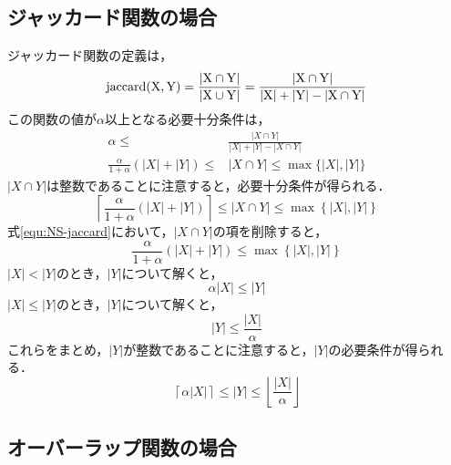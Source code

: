 \documentclass[japanese]{jnlp_JS2.0}
\begin{document}
\subsection*{ジャッカード関数の場合}

ジャッカード関数の定義は，
\begin{equation}
 \rm{jaccard}(X, Y) = \frac{|X \cap Y|}{|X \cup Y|} = \frac{|X \cap Y|}{|X| + |Y| - |X \cap Y|}
\end{equation}
この関数の値が$\alpha$以上となる必要十分条件は，
\begin{align}
 \alpha \leq& \frac{|X \cap Y|}{|X| + |Y| - |X \cap Y|} \\
 \frac{\alpha}{1 + \alpha} \left(|X| + |Y| \right) \leq& |X \cap Y| \leq \max\{|X|, |Y|\} \label{equ:NS-jaccard}
\end{align}
$|X \cap Y|$は整数であることに注意すると，必要十分条件が得られる．
\begin{equation}
 \left\lceil \frac{\alpha}{1 + \alpha} \left(|X| + |Y| \right) \right\rceil \leq |X \cap Y| \leq \max \left\{|X|, |Y|\right\}
\end{equation}
式\ref{equ:NS-jaccard}において，$|X \cap Y|$の項を削除すると，
\begin{equation}
 \frac{\alpha}{1 + \alpha} \left(|X| + |Y| \right) \leq \max \left\{|X|, |Y|\right\}
\end{equation}
$|X| < |Y|$のとき，$|Y|$について解くと，
\begin{equation}
 \alpha |X| \leq |Y|
\end{equation}
$|X| \leq |Y|$のとき，$|Y|$について解くと，
\begin{equation}
 |Y| \leq \frac{|X|}{\alpha}
\end{equation}
これらをまとめ，$|Y|$が整数であることに注意すると，$|Y|$の必要条件が得られる．
\begin{equation}
 \left\lceil \alpha |X| \right\rceil \leq |Y| \leq \left\lfloor \frac{|X|}{\alpha} \right\rfloor
\end{equation}


\subsection*{オーバーラップ関数の場合}
\end{document}
